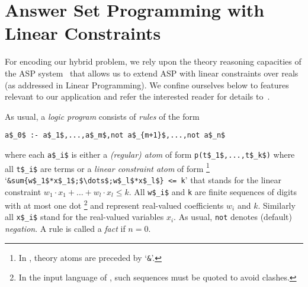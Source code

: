 
\section{Answer Set Programming with Linear Constraints}\label{sec:background}

For encoding our hybrid problem,
we rely upon the theory reasoning capacities of the ASP system \clingo\ that allows us to extend ASP with linear constraints over reals
(as addressed in Linear Programming).
We confine ourselves below to features relevant to our application and refer the interested reader for details to~\citep{gekakaosscwa16a}.

As usual, a \emph{logic program} consists of \emph{rules} of the form
\begin{lstlisting}[mathescape=true,numbers=none]
   a$_0$ :- a$_1$,...,a$_m$,not a$_{m+1}$,...,not a$_n$
\end{lstlisting}
where each \lstinline[mathescape=true]{a$_i$} is either
a \emph{(regular) atom} of form \lstinline[mathescape=true]{p(t$_1$,...,t$_k$)}
where all \lstinline[mathescape=true]{t$_i$} are terms
or
a \emph{linear constraint atom} of form%
\footnote{In \clingo, theory atoms are preceded by `\texttt{\&}'.}
`\lstinline[mathescape=true]@&sum{w$_1$*x$_1$;$\dots$;w$_l$*x$_l$} <= k@'
that stands for the linear constraint
\(
w_1\cdot x_1+\dots+w_l\cdot x_l\leq k
\).
All \lstinline[mathescape=true]{w$_i$} and \lstinline[mathescape=true]{k} are finite sequences of digits with at most one dot%
\footnote{In the input language of \clingo, such sequences must be quoted to avoid clashes.}
and represent real-valued coefficients $w_i$ and $k$.
Similarly all \lstinline[mathescape=true]{x$_i$} stand for the real-valued variables $x_i$.
%
As usual, \lstinline[mathescape=true]{not} denotes (default) \emph{negation}.
A rule is called a \emph{fact} if $n=0$.

